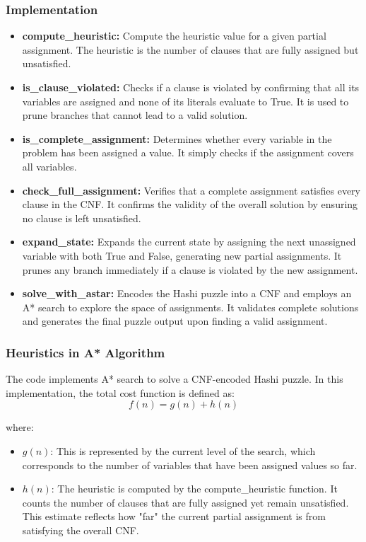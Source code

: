 \subsubsection{Implementation}
\begin{itemize}
    \item \textbf{compute\_heuristic:} Compute the heuristic value for a given partial assignment. The heuristic is the number of clauses that are fully assigned but unsatisfied.
    \item \textbf{is\_clause\_violated:} Checks if a clause is violated by confirming that all its variables are assigned and none of its literals evaluate to True. It is used to prune branches that cannot lead to a valid solution.
    \item \textbf{is\_complete\_assignment:} Determines whether every variable in the problem has been assigned a value. It simply checks if the assignment covers all variables.
    \item \textbf{check\_full\_assignment:} Verifies that a complete assignment satisfies every clause in the CNF. It confirms the validity of the overall solution by ensuring no clause is left unsatisfied.
    \item \textbf{expand\_state:} Expands the current state by assigning the next unassigned variable with both True and False, generating new partial assignments. It prunes any branch immediately if a clause is violated by the new assignment.
    \item \textbf{solve\_with\_astar:} Encodes the Hashi puzzle into a CNF and employs an A* search to explore the space of assignments. It validates complete solutions and generates the final puzzle output upon finding a valid assignment.
\end{itemize}


\subsubsection{Heuristics in A* Algorithm}
The code implements A* search to solve a CNF-encoded Hashi puzzle. In this implementation, the total cost function is defined as:
\[
    f(n) = g(n) + h(n)
\]

where:
\begin{itemize}
    \item \( g(n) \): This is represented by the current level of the search, which corresponds to the number of variables that have been assigned values so far.

    \item \( h(n) \): The heuristic is computed by the compute\_heuristic function. It counts the number of clauses that are fully assigned yet remain unsatisfied. This estimate reflects how "far" the current partial assignment is from satisfying the overall CNF.
\end{itemize}


